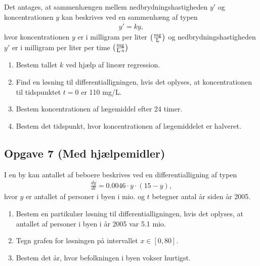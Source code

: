 Det antages, at sammenhængen mellem nedbrydningshastigheden $y'$ og koncentrationen $y$ kan beskrives ved en sammenhæng af typen
\begin{align*}
	y' = ky,
\end{align*}
hvor koncentrationen $y$ er i milligram per liter $\left(\frac{\textnormal{mg}}{\textnormal{L}}\right)$ og nedbrydningshastigheden $y'$ er i milligram per liter per time $\left(\frac{\textnormal{mg}}{\textnormal{L}\cdot \textnormal{s}}\right)$
\begin{enumerate}[label=\roman*)]
	\item Bestem tallet $k$ ved hjælp af lineær regression. 
	\item Find en løsning til differentialligningen, hvis det oplyses, at koncentrationen til tidspunktet $t = 0$ er 110 mg/L.
	\item Bestem koncentrationen af lægemiddel efter 24 timer.
	\item Bestem det tidspunkt, hvor koncentrationen af lægemiddelet er halveret. 
\end{enumerate}

\subsection*{Opgave 7 (Med hjælpemidler)}

I en by kan antallet af beboere beskrives ved en differentialligning af typen
\begin{align*}
	\frac{dy}{dt} = 0.0046\cdot y \cdot (15 - y),
\end{align*}
hvor $y$ er antallet af personer i byen i mio. og $t$ betegner antal år siden år 2005.
\begin{enumerate}[label=\roman*)]
	\item Bestem en partikulær løsning til differentialligningen, hvis det oplyses, at antallet af personer i byen i år 2005 var 5.1 mio. 
	\item Tegn grafen for løsningen på intervallet $x \in [0, 80]$. 
	\item Bestem det år, hvor befolkningen i byen vokser hurtigst. 
\end{enumerate}

